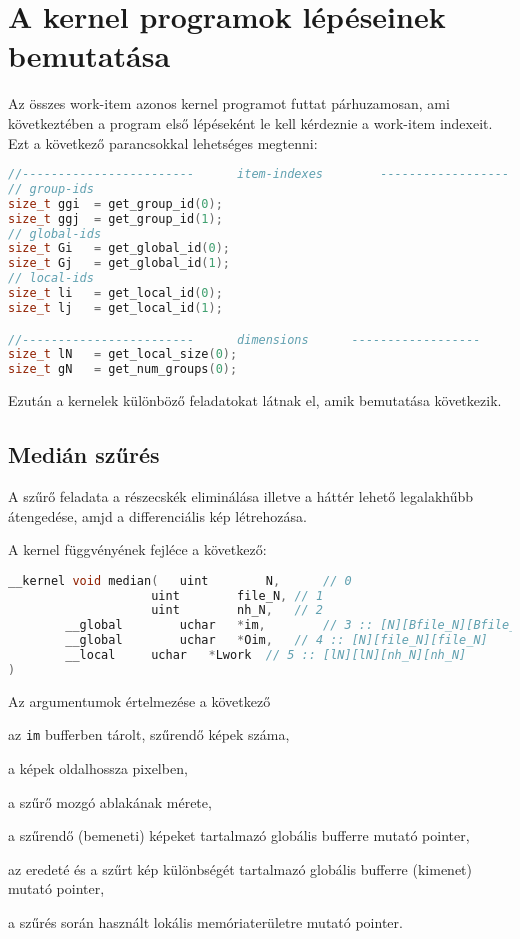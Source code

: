 \chapter{A kernel programok lépéseinek bemutatása}
Az összes work-item azonos kernel programot futtat párhuzamosan, ami következtében a program első lépéseként le kell kérdeznie a
work-item indexeit. Ezt a következő parancsokkal lehetséges megtenni:
\begin{lstlisting}[language=C++]
//------------------------		item-indexes		------------------
// group-ids
size_t ggi	= get_group_id(0);
size_t ggj	= get_group_id(1);
// global-ids
size_t Gi	= get_global_id(0);
size_t Gj	= get_global_id(1);
// local-ids
size_t li	= get_local_id(0);
size_t lj	= get_local_id(1);

//------------------------		dimensions		------------------
size_t lN	= get_local_size(0);
size_t gN	= get_num_groups(0);
\end{lstlisting}

\noindent Ezután a kernelek különböző feladatokat látnak el, amik bemutatása következik. 
\section{Medián szűrés}
	A szűrő feladata a részecskék eliminálása illetve a háttér lehető legalakhűbb átengedése, amjd a differenciális kép létrehozása.
	
\noindent A kernel függvényének fejléce a következő:
\begin{lstlisting}[language=C++]
__kernel void median(	uint		N,		// 0
					uint		file_N,	// 1
					uint		nh_N,	// 2
		__global		uchar	*im,		// 3 :: [N][Bfile_N][Bfile_N]					
		__global		uchar	*Oim,	// 4 :: [N][file_N][file_N]
		__local		uchar	*Lwork	// 5 :: [lN][lN][nh_N][nh_N]
)
\end{lstlisting}

\noindent Az argumentumok értelmezése a következő
	\begin{description}[noitemsep]
		\item[\texttt{N}] az \texttt{im} bufferben tárolt, szűrendő képek száma,
		\item[\texttt{file\_N}] a képek oldalhossza pixelben,
		\item[\texttt{nh\_N}] a szűrő mozgó ablakának mérete,
		\item[\texttt{im}] a szűrendő (bemeneti) képeket tartalmazó globális bufferre mutató pointer,
		\item[\texttt{Oim}] az eredeté és a szűrt kép különbségét tartalmazó globális bufferre (kimenet) mutató pointer,
		\item[\texttt{Lwork}] a szűrés során használt lokális memóriaterületre mutató pointer.
	\end{description}
	
